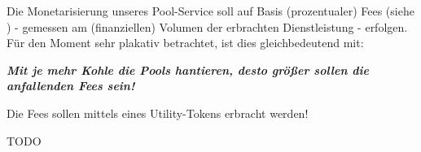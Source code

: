 \vspace{0.2cm} 

\begin{Praemisse}[Monetarisierung]

Die Monetarisierung unseres Pool-Service soll auf Basis (prozentualer) Fees (siehe ) - gemessen am (finanziellen) Volumen der erbrachten Dienst\-leistung - erfolgen. Für den Moment sehr plakativ betrachtet, ist dies gleichbedeutend mit: 

\vspace{0.2cm} 

\textbf{\textit{Mit je mehr Kohle die Pools hantieren, desto größer sollen die anfallenden Fees sein!}}

\end{Praemisse}

\vspace{0.5cm}

\begin{Praemisse}

Die Fees sollen mittels eines Utility-Tokens erbracht werden!

\vspace{0.2cm} 

TODO

\end{Praemisse}

\vspace{0.5cm}


